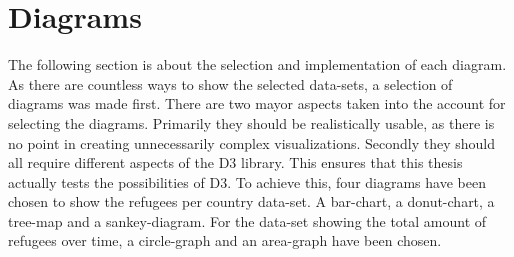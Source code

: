





\section{Diagrams}

The following section is about the selection and implementation of each diagram. As there are countless ways to show the selected data-sets, a selection of diagrams was made first. There are two mayor aspects taken into the account for selecting the diagrams. Primarily they should be realistically usable, as there is no point in creating unnecessarily complex visualizations. Secondly they should all require different aspects of the D3 library. This ensures that this thesis actually tests the possibilities of D3. To achieve this, four diagrams have been chosen to show the refugees per country data-set. A bar-chart, a donut-chart, a tree-map and a sankey-diagram. For the data-set showing the total amount of refugees over time, a circle-graph and an area-graph have been chosen.

